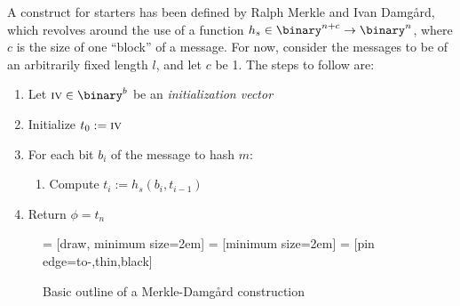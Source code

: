 A construct for starters has been defined by Ralph Merkle and Ivan Damg\r{a}rd, which revolves around the use of a \crh{} function $h_s \in \binary^{n + c} \to \binary^n$, where $c$ is the size of one ``block'' of a message. For now, consider the messages to be of an arbitrarily fixed length $l$, and let $c$ be 1.  The steps to follow are:

\begin{enumerate}
    \item Let $\textsc{iv} \in \binary^b$ be an \emph{initialization vector}
    \item Initialize $t_0 := \textsc{iv}$
    \item For each bit $b_i$ of the message to hash $m$:
    \begin{enumerate}
        \item Compute $t_i := h_s(b_i, t_{i - 1})$
    \end{enumerate}
    \item Return $\phi = t_n$
\end{enumerate}



\begin{figure}
    \centering

       = [draw, minimum size=2em]
     = [minimum size=2em]
      = [pin edge={to-,thin,black}]

    \caption{Basic outline of a Merkle-Damg\r{a}rd construction}
    \label{fig:mdbase}
\end{figure}

